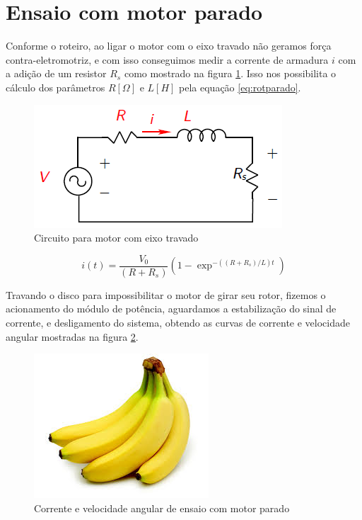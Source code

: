 \documentclass{article}
\begin{document}
\section{Ensaio com motor parado}
Conforme o roteiro\cite{bb:roteiro}, ao ligar o motor com o eixo travado não geramos força contra-eletromotriz, e com isso conseguimos medir a corrente de armadura $i$ com a adição de um resistor $R_s$ como mostrado na figura \ref{fig:rotparado}. Isso nos possibilita o cálculo dos parâmetros $R [\Omega]$ e $L [H]$ pela equação \ref{eq:rotparado}.

\begin{figure}[H]
	\centering
	\includegraphics[width=0.8\linewidth]{rotparado}
	\caption{Circuito para motor com eixo travado}
	\label{fig:rotparado}
\end{figure}

\begin{equation}
\label{eq:rotparado}
i(t) = \frac{V_0}{(R+R_s)}(1-\exp^{-((R+R_s)/L)t})
\end{equation}

Travando o disco para impossibilitar o motor de girar seu rotor, fizemos o acionamento do módulo de potência, aguardamos a estabilização do sinal de corrente, e desligamento do sistema, obtendo as curvas de corrente e velocidade angular mostradas na figura \ref{fig:ensaiop}.

\begin{figure}[H]
	\centering
	\includegraphics[width=0.8\linewidth]{ensaiop}
	\caption{Corrente e velocidade angular de ensaio com motor parado}
	\label{fig:ensaiop}
\end{figure}
\end{document}
